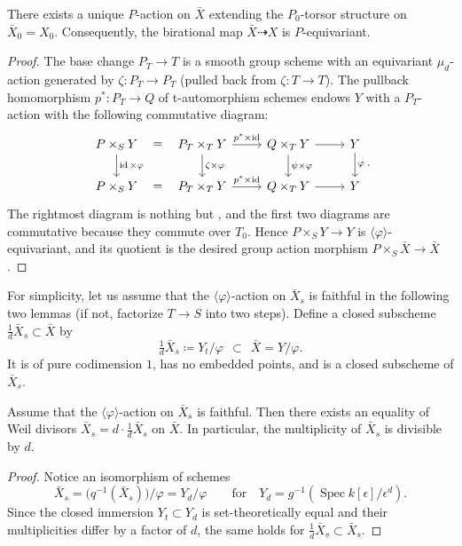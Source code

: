 \documentclass[reqno, letterpaper]{amsart}
\numberwithin{equation}{subsection}
\let\to\longrightarrow
\DeclareMathOperator{\id}{id}
\DeclareMathOperator{\Spec}{Spec}
\begin{document}
			\begin{proposition} \label{prop:P-action on bar X}
				There exists a unique $P$-action on $\bar X$ extending the $P_0$-torsor structure on $\bar X_0 = X_0$. Consequently, the birational map $\bar X \dashrightarrow X$ is $P$-equivariant.
			\end{proposition}
			\begin{proof}
				The base change $P_T \to T$ is a smooth group scheme with an equivariant $\mu_d$-action generated by $\zeta : P_T \to P_T$ (pulled back from $\zeta : T \to T$). The pullback homomorphism $p^* : P_T \to Q$ of t-automorphism schemes endows $Y$ with a $P_T$-action with the following commutative diagram:
				\[\begin{tikzcd}[column sep=normal]
					P \times_S Y \arrow[r, phantom, "="] \arrow[d, "\id \times \varphi"] & P_T \times_T Y \arrow[r, "p^* \times \id"] \arrow[d, "\zeta \times \varphi"] & Q \times_T Y \arrow[r] \arrow[d, "\psi \times \varphi"] & Y \arrow[d, "\varphi"] \\
					P \times_S Y \arrow[r, phantom, "="] & P_T \times_T Y \arrow[r, "p^* \times \id"] & Q \times_T Y \arrow[r] & Y
				\end{tikzcd}.\]
				The rightmost diagram is nothing but , and the first two diagrams are commutative because they commute over $T_0$. Hence $P \times_S Y \to Y$ is $\langle \varphi \rangle$-equivariant, and its quotient is the desired group action morphism $P \times_S \bar X \to \bar X$.
			\end{proof}
			
			For simplicity, let us assume that the $\langle \varphi \rangle$-action on $\bar X_s$ is faithful in the following two lemmas (if not, factorize $T \to S$ into two steps). Define a closed subscheme $\frac{1}{d}\bar X_s \subset \bar X$ by
			\[ \tfrac{1}{d} \bar X_s \coloneq Y_t / \varphi \ \ \subset \ \ \bar X = Y / \varphi .\]
			It is of pure codimension $1$, has no embedded points, and is a closed subscheme of $\bar X_s$.
			
			\begin{lemma} \label{lem:1/d X_s}
				Assume that the $\langle \varphi \rangle$-action on $\bar X_s$ is faithful. Then there exists an equality of Weil divisors $\bar X_s = d \cdot \frac{1}{d} \bar X_s$ on $\bar X$. In particular, the multiplicity of $\bar X_s$ is divisible by $d$.
			\end{lemma}
			\begin{proof}
				Notice an isomorphism of schemes
				\[ \bar X_s = \big( q^{-1}(\bar X_s) \big) / \varphi = Y_d / \varphi \qquad\mbox{for}\quad Y_d = g^{-1} (\Spec k[\epsilon]/\epsilon^d) .\]
				Since the closed immersion $Y_t \subset Y_d$ is set-theoretically equal and their multiplicities differ by a factor of $d$, the same holds for $\frac{1}{d} \bar X_s \subset \bar X_s$.
			\end{proof}
			
\end{document}
